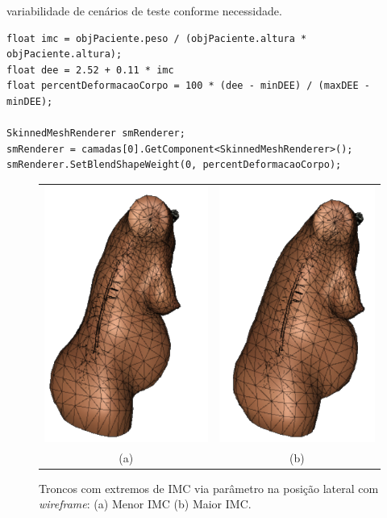 variabilidade de cenários de teste conforme necessidade.

\begin{lstlisting}[label=lst:codigo_alteracao_forma_paciente, caption={Exemplo de alteração do corpo do paciente via script em C\#.}, language=sharpc]
float imc = objPaciente.peso / (objPaciente.altura * objPaciente.altura);
float dee = 2.52 + 0.11 * imc
float percentDeformacaoCorpo = 100 * (dee - minDEE) / (maxDEE - minDEE);
        
SkinnedMeshRenderer smRenderer;
smRenderer = camadas[0].GetComponent<SkinnedMeshRenderer>();
smRenderer.SetBlendShapeWeight(0, percentDeformacaoCorpo);
\end{lstlisting}

\begin{figure}[ht!]
    \centering
        \begin{tabular}{cc}
        \includegraphics[width=0.4\linewidth]{capitulos/figuras/Corpo-menor-IMC-Wireframe.png} & 
        \includegraphics[width=0.38\linewidth]{capitulos/figuras/Corpo-maior-IMC-Wireframe.png} 
        \\
        (a) & (b)
        \end{tabular}
    \caption{Troncos com extremos de \acrshort{IMC} via parâmetro na posição lateral com \textit{wireframe}: (a) Menor \acrshort{IMC} (b) Maior \acrshort{IMC}.}
    \label{fig:extremosCorpoIMC}
\end{figure}

